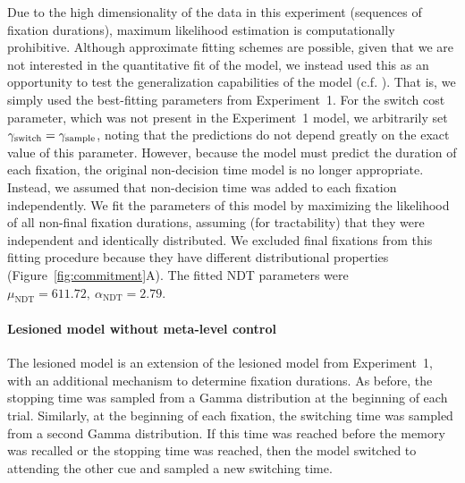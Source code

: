 Due to the high dimensionality of the data in this experiment (sequences of fixation durations), maximum likelihood estimation is computationally prohibitive. Although approximate fitting schemes are possible, given that we are not interested in the quantitative fit of the model, we instead used this as an opportunity to test the generalization capabilities of the model (c.f. \citealp{krajbich2011multialternative}). That is, we simply used the best-fitting parameters from Experiment~1. For the switch cost parameter, which was not present in the Experiment~1 model, we arbitrarily set $\gamma_\text{switch} = \gamma_\text{sample}$, noting that the predictions do not depend greatly on the exact value of this parameter. However, because the model must predict the duration of each fixation, the original non-decision time model is no longer appropriate. Instead, we assumed that non-decision time was added to each fixation independently. We fit the parameters of this model by maximizing the likelihood of all non-final fixation durations, assuming (for tractability) that they were independent and identically distributed. We excluded final fixations from this fitting procedure because they have different distributional properties (Figure~\ref{fig:commitment}A). The fitted NDT parameters were \(
            \mu_\text{NDT} = 611.72,\ 
            \alpha_\text{NDT} = 2.79
        \).

\paragraph{Lesioned model without meta-level control}

The lesioned model is an extension of the lesioned model from Experiment~1, with an additional mechanism to determine fixation durations. As before, the stopping time was sampled from a Gamma distribution at the beginning of each trial. Similarly, at the beginning of each fixation, the switching time was sampled from a second Gamma distribution. If this time was reached before the memory was recalled or the stopping time was reached, then the model switched to attending the other cue and sampled a new switching time.

